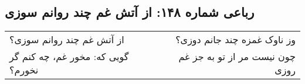 \begin{center}
\section*{رباعی شماره ۱۴۸: از آتش غم چند روانم سوزی}
\label{sec:148}
\begin{longtable}{l p{0.5cm} r}
از آتش غم چند روانم سوزی؟
&&
وز ناوک غمزه چند جانم دوزی؟
\\
گویی که: مخور غم، چه کنم گر نخورم؟
&&
چون نیست مر از تو به جز غم روزی
\\
\end{longtable}
\end{center}

